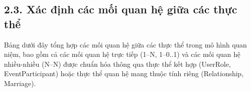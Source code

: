 \hypertarget{xuxe1c-ux111ux1ecbnh-cuxe1c-mux1ed1i-quan-hux1ec7-giux1eefa-cuxe1c-thux1ef1c-thux1ec3}{%
\subsection{\texorpdfstring{\textbf{2.3. Xác định các mối quan hệ giữa các thực thể}}{2.3. Xác định các mối quan hệ giữa các thực thể}}\label{xuxe1c-ux111ux1ecbnh-cuxe1c-mux1ed1i-quan-hux1ec7-giux1eefa-cuxe1c-thux1ef1c-thux1ec3}}

Bảng dưới đây tổng hợp các mối quan hệ giữa các thực thể trong mô hình quan niệm, bao gồm cả các mối quan hệ trực tiếp (1--N, 1--0..1) và các mối quan hệ nhiều-nhiều (N--N) được chuẩn hóa thông qua thực thể kết hợp (UserRole, EventParticipant) hoặc thực thể quan hệ mang thuộc tính riêng (Relationship, Marriage).

